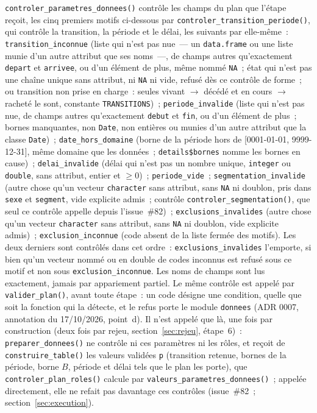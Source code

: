 \documentclass[a4paper,11pt]{article}
\newcommand{\code}[1]{\texttt{\small #1}}
\begin{document}
\medskip
{\sloppy{} \code{controler\_parametres\_donnees()} contrôle les champs du plan que l'étape
reçoit, les cinq premiers motifs ci-dessous par
\code{controler\_transition\_periode()}, qui contrôle la transition, la
période et le délai, les suivants par elle-même~: \code{transition\_inconnue} (liste qui n'est pas nue~--- un
\code{data.frame} ou une liste munie d'un autre attribut que ses noms~---, de
champs autres qu'exactement \code{depart} et \code{arrivee}, ou d'un élément
de plus, même nommé \code{NA}~; état qui n'est pas une chaîne unique sans
attribut, ni \code{NA} ni vide, refusé dès ce contrôle de forme~; ou transition non prise en charge~: seules
vivant $\to$ décédé et en cours $\to$ racheté le sont, constante
\code{TRANSITIONS})~; \code{periode\_invalide} (liste qui n'est pas nue, de
champs autres qu'exactement \code{debut} et \code{fin}, ou d'un élément de
plus~; bornes manquantes, non \code{Date}, non entières ou munies d'un autre
attribut que la classe \code{Date})~; \code{date\_hors\_domaine} (borne
de la période hors de [0001-01-01, 9999-12-31], même domaine que les
données~; \code{details\$bornes} nomme les bornes en cause)~; \code{delai\_invalide} (délai qui
n'est pas un nombre unique, \code{integer} ou \code{double}, sans attribut,
entier et $\ge 0$)~; \code{periode\_vide}~; \code{segmentation\_invalide}
(autre chose qu'un vecteur \code{character} sans attribut, sans \code{NA} ni
doublon, pris dans \code{sexe} et \code{segment}, vide explicite admis~;
contrôle \code{controler\_segmentation()}, que seul ce contrôle appelle
depuis l'issue~\#82)~;
\code{exclusions\_invalides} (autre chose qu'un vecteur \code{character} sans
attribut, sans \code{NA} ni doublon, vide explicite admis)~;
\code{exclusion\_inconnue} (code absent de la liste fermée des motifs). Les
deux derniers sont contrôlés dans cet ordre~: \code{exclusions\_invalides}
l'emporte, si bien qu'un vecteur nommé ou en double de codes inconnus est
refusé sous ce motif et non sous \code{exclusion\_inconnue}. Les noms de champs sont lus exactement, jamais par
appariement partiel. Le même contrôle est appelé par \code{valider\_plan()},
avant toute étape~: un code désigne une condition, quelle que soit la fonction
qui la détecte, et le refus porte le module \code{donnees} (ADR 0007,
annotation du 17/10/2026, point~d). Il n'est appelé que là, une fois par
construction (deux fois par rejeu, section~\ref{sec:rejeu}, étape~6)~:
\code{preparer\_donnees()} ne contrôle ni ces paramètres ni les rôles, et
reçoit de \code{construire\_table()} les valeurs validées \code{p}
(transition retenue, bornes de la période, borne $B$, période et délai
tels que le plan les porte), que
\code{controler\_plan\_roles()} calcule par
\code{valeurs\_parametres\_donnees()}~; appelée directement, elle ne
refait pas davantage ces contrôles (issue~\#82~;
section~\ref{sec:execution}).\par}
\end{document}
